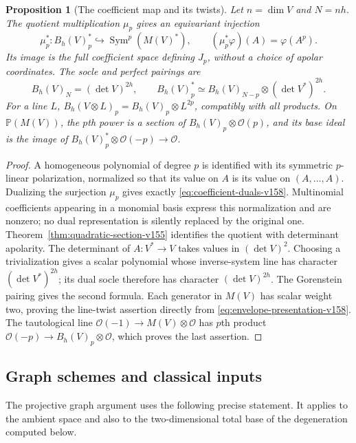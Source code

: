 \documentclass[11pt,reqno]{amsart}
\numberwithin{equation}{section}
\newtheorem{proposition}[theorem]{Proposition}
\theoremstyle{definition}\newtheorem{definition}[theorem]{Definition}
\theoremstyle{remark}\newtheorem{remark}[theorem]{Remark}
\newcommand{\Pj}{\mathbb P}\newcommand{\A}{\mathbb A}
\newcommand{\OO}{\mathcal O}\newcommand{\II}{\mathcal I}
\DeclareMathOperator{\Sym}{Sym}\DeclareMathOperator{\Gr}{Gr}
\begin{document}
\begin{proposition}[The coefficient map and its twists]
\label{prop:coefficient-conventions-v158}
Let $n=\dim V$ and $N=nh$. The quotient multiplication $\mu_p$ gives
an equivariant injection
\begin{equation}\label{eq:coefficient-duals-v158}
 \mu_p^*:B_h(V)_p^*\hookrightarrow\Sym^p(M(V)^*),
 \qquad (\mu_p^*\varphi)(A)=\varphi(A^p).
\end{equation}
Its image is the full coefficient space defining $J_p$, without a
choice of apolar coordinates. The socle and perfect pairings are
\begin{equation}\label{eq:perfect-twist-v158}
 B_h(V)_N=(\det V)^{2h},\qquad
 B_h(V)_p^*\simeq B_h(V)_{N-p}\otimes(\det V^*)^{2h}.
\end{equation}
For a line $L$, $B_h(V\otimes L)_p=B_h(V)_p\otimes L^{2p}$,
compatibly with all products. On $\Pj(M(V))$, the $p$th power is a
section of $B_h(V)_p\otimes\OO(p)$, and its base ideal is the image
of $B_h(V)_p^*\otimes\OO(-p)\to\OO$.
\end{proposition}
\begin{proof}
A homogeneous polynomial of degree $p$ is identified with its symmetric
$p$-linear polarization, normalized so that its value on $A$ is its
value on $(A,\ldots,A)$. Dualizing the surjection $\mu_p$ gives exactly
\eqref{eq:coefficient-duals-v158}. Multinomial coefficients appearing
in a monomial basis express this normalization and are nonzero; no
dual representation is silently replaced by the original one.
Theorem~\ref{thm:quadratic-section-v155} identifies the quotient with
determinant apolarity. The determinant of $A:V^*\to V$ takes values
in $(\det V)^2$. Choosing a trivialization gives a scalar polynomial
whose inverse-system line has character $(\det V^*)^{2h}$; its dual
socle therefore has character $(\det V)^{2h}$. The Gorenstein pairing
gives the second formula. Each generator in $M(V)$ has scalar weight
two, proving the line-twist assertion directly from
\eqref{eq:envelope-presentation-v158}. The tautological line
$\OO(-1)\to M(V)\otimes\OO$ has $p$th product
$\OO(-p)\to B_h(V)_p\otimes\OO$, which proves the last assertion.
\end{proof}


\subsection{Graph schemes and classical inputs}
The projective graph argument uses the following precise statement.
It applies to the ambient space and also to the two-dimensional total
base of the degeneration computed below.
\end{document}
